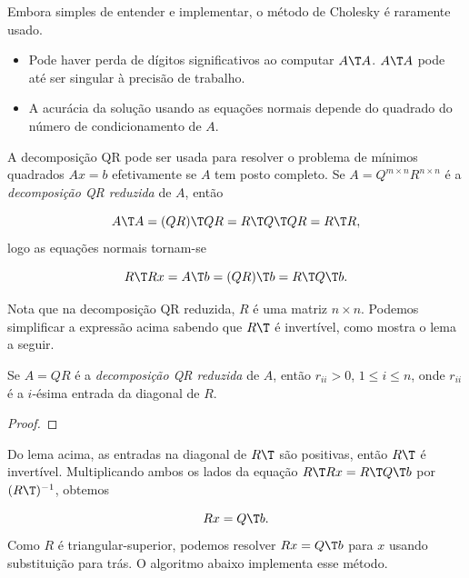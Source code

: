 \documentclass{article}
\begin{document}
Embora simples de entender e implementar, o método de Cholesky é raramente usado.

\begin{itemize}
    \item Pode haver perda de dígitos significativos ao computar \(A\T A\). \(A\T A\) pode até ser singular à precisão de trabalho.
    \item A acurácia da solução usando as equações normais depende do quadrado do número de condicionamento de \(A\).
\end{itemize}

A decomposição QR pode ser usada para resolver o problema de mínimos quadrados \(Ax=b\) efetivamente se \(A\) tem posto completo. Se \(A = Q^{m \times n} R^{n \times n}\) é a \emph{decomposição QR reduzida} de \(A\), então

\begin{equation}
    A\T  A = (Q R)\T  Q R = R\T  Q\T  Q R = R\T  R,
\end{equation} logo as equações normais tornam-se

\begin{equation}
    R\T  R x = A\T  b = (Q R)\T  b = R\T  Q\T  b.
\end{equation}

Nota que na decomposição QR reduzida, \(R\) é uma matriz \(n \times n\). Podemos simplificar a expressão acima sabendo que \(R\T \) é invertível, como mostra o lema a seguir.

\begin{lem}
    Se \(A = QR\) é a \emph{decomposição QR reduzida} de \(A\), então \(r_{ii} > 0\), \(1 \leq i \leq n\), onde \(r_{ii}\) é a \(i\)-ésima entrada da diagonal de \(R\).
\end{lem}

\begin{proof}
    
\end{proof}

Do lema acima, as entradas na diagonal de \(R\T \) são positivas, então \(R\T \) é invertível. Multiplicando ambos os lados da equação \(R\T  R x = R\T  Q\T  b\) por \((R\T )^{-1}\), obtemos

\begin{equation}
    R x = Q\T  b.
\end{equation} Como \(R\) é triangular-superior, podemos resolver \(Rx = Q\T b\) para \(x\) usando substituição para trás. O algoritmo abaixo implementa esse método.
\end{document}
